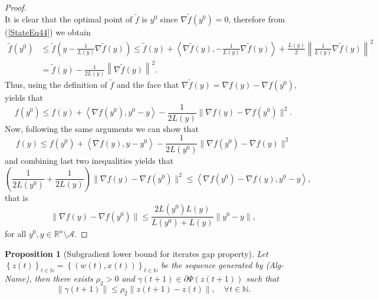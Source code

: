 \documentclass[11pt]{article}
\numberwithin{equation}{section}
\newtheorem{proposition}{Proposition}[section]
\begin{document}
\begin{proof}
\begin{equation}
\end{equation}
It is clear that the optimal point of $\widetilde{f}$ is $y^0$ since $\nabla \widetilde{f}(y^0) = 0$, therefore from (\ref{StateEq44}) we obtain
\begin{equation*}
\begin{aligned}
	\widetilde{f}(y^0) &\leq \widetilde{f}\left( y - \frac{1}{L(y)} \nabla \widetilde{f}(y) \right) \leq \widetilde{f}(y) + \left\langle \nabla \widetilde{f}(y), - \frac{1}{L(y)} \nabla \widetilde{f}(y) \right\rangle + \frac{L(y)}{2} \left\lVert \frac{1}{L(y)} \nabla \widetilde{f}(y) \right\rVert ^2 \\
	&= \widetilde{f}(y) - \frac{1}{2 L(y)} \left\lVert \nabla \widetilde{f}(y) \right\rVert ^2.
\end{aligned}
\end{equation*}
Thus, using the definition of $\widetilde{f}$ and the face that $\nabla \widetilde{f}(y) = \nabla f(y) - \nabla f(y^0)$, yields that
\begin{equation*}
	f(y^0) \leq f(y) + \left\langle \nabla f(y^0), y^0 - y \right\rangle - \frac{1}{2 L(y)} \| \nabla f(y) - \nabla f(y^0) \|^2 .
\end{equation*}
Now, following the same arguments we can show that
\begin{equation*}
	f(y) \leq f(y^0) + \left\langle \nabla f(y), y - y^0 \right\rangle - \frac{1}{2 L(y^0)} \| \nabla f(y^0) - \nabla f(y) \|^2
\end{equation*}
and combining last two inequalities yields that
\begin{equation*}
	\left( \frac{1}{2 L(y^0)} + \frac{1}{2 L(y)} \right) \| \nabla f(y) - \nabla f(y^0) \|^2 \leq \left\langle \nabla f(y^0) - \nabla f(y), y^0 - y \right\rangle ,
\end{equation*}
that is 
\begin{equation*}
	\| \nabla f(y) - \nabla f(y^0) \| \leq \frac{2L(y^0)L(y)}{L(y^0) + L(y)} \|y^0 - y\| ,
\end{equation*}
for all $y^0,y \in \mathbb{R}^n \setminus \mathcal{A}$.
\end{proof}

\begin{proposition}[Subgradient lower bound for iterates gap property]
Let $\left\lbrace z(t) \right\rbrace_{t \in \mathbb{N}} = \left\lbrace (w(t) , x(t)) \right\rbrace_{t \in \mathbb{N}}$ be the sequence generated by (Alg-Name), then there exists $\rho_2 > 0$ and $\gamma(t+1) \in \partial \Psi(z(t+1))$ such that 
\begin{equation*}
	\| \gamma(t+1)\| \leq \rho_2 \|z(t+1) - z(t)\|, \quad \forall t \in \mathbb{N} .
\end{equation*}
\end{proposition}
\end{document}
